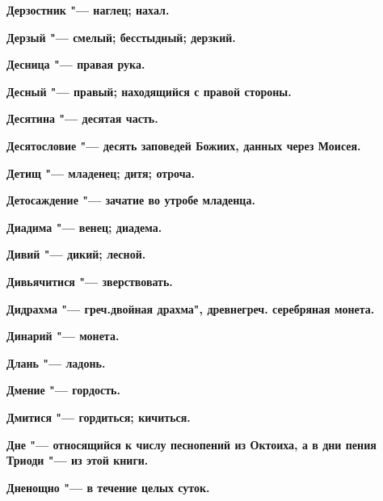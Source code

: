\bfseries Дерзостник \normalfont{} "--- наглец; нахал. 




\bfseries Дерзый \normalfont{} "--- смелый; бесстыдный; дерзкий. 




\bfseries Десница \normalfont{} "--- правая рука. 




\bfseries Десный \normalfont{} "--- правый; находящийся с правой стороны. 




\bfseries Десятина \normalfont{} "--- десятая часть. 




\bfseries Десятословие \normalfont{} "--- десять заповедей Божиих, данных через Моисея. 




\bfseries Детищ \normalfont{} "--- младенец; дитя; отроча. 




\bfseries Детосаждение \normalfont{} "--- зачатие во утробе младенца. 




\bfseries Диадима \normalfont{} "--- венец; диадема. 




\bfseries Дивий \normalfont{} "--- дикий; лесной. 




\bfseries Дивьячитися \normalfont{} "--- зверствовать. 




\bfseries Дидрахма \normalfont{} "--- греч.двойная драхма", древнегреч. серебряная монета. 




\bfseries Динарий \normalfont{} "--- монета. 




\bfseries Длань \normalfont{} "--- ладонь. 




\bfseries Дмение \normalfont{} "--- гордость. 




\bfseries Дмитися \normalfont{} "--- гордиться; кичиться. 




\bfseries Дне \normalfont{} "--- относящийся к числу песнопений из Октоиха, а в дни пения Триоди "--- из этой книги. 




\bfseries Дненощно \normalfont{} "--- в течение целых суток. 




